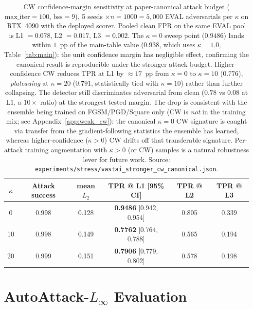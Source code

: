 \begin{table}[h]
\centering
\small
\begin{tabular}{cccccc}
\toprule
$\kappa$ & Attack success & mean $L_2$ & TPR @ L1 [95\% CI] & TPR @ L2 & TPR @ L3 \\
\midrule
0              & 0.998 & 0.128 & \textbf{0.9486} [0.942, 0.954] & 0.805 & 0.339 \\
10             & 0.998 & 0.149 & \textbf{0.7762} [0.764, 0.788] & 0.565 & 0.194 \\
20             & 0.999 & 0.151 & \textbf{0.7906} [0.779, 0.802] & 0.578 & 0.198 \\
\bottomrule
\end{tabular}
\caption{CW confidence-margin sensitivity at paper-canonical attack
budget ($\text{max\_iter}{=}100$, $\text{bss}{=}9$), 5 seeds
$\times n{=}1000 = 5{,}000$ EVAL adversarials per $\kappa$ on RTX~4090
with the deployed scorer. Pooled clean FPR on the same EVAL pool is
L1 $=0.078$, L2 $=0.017$, L3 $=0.002$. The $\kappa{=}0$ sweep point
($0.9486$) lands within $1$~pp of the main-table value ($0.938$, which
uses $\kappa{=}1.0$, Table~\ref{tab:main}); the unit confidence margin has
negligible effect, confirming the canonical result is reproducible
under the stronger attack budget. Higher-confidence CW reduces TPR at
L1 by $\approx 17$~pp from $\kappa{=}0$ to $\kappa{=}10$ ($0.776$),
\emph{plateauing} at $\kappa{=}20$ ($0.791$, statistically tied with
$\kappa{=}10$) rather than further collapsing. The detector still
discriminates adversarial from clean ($0.78$ vs $0.08$ at L1, a
$10\times$ ratio) at the strongest tested margin. The drop is
consistent with the ensemble being trained on FGSM/PGD/Square only (CW is
\emph{not} in the training mix; see Appendix~\ref{app:weak_cw}): the
canonical $\kappa{=}0$ CW signature is caught via transfer from the
gradient-following statistics the ensemble has learned, whereas
higher-confidence ($\kappa{>}0$) CW drifts off that transferable
signature. Per-attack training augmentation with $\kappa{>}0$ (or CW)
samples is a natural robustness lever for future work. Source:
\texttt{experiments/stress/vastai\_stronger\_cw\_canonical.json}.}
\label{tab:strong_cw}
\end{table}


\section{AutoAttack-\texorpdfstring{$L_\infty$}{L-infinity} Evaluation}
\label{app:autoattack}

